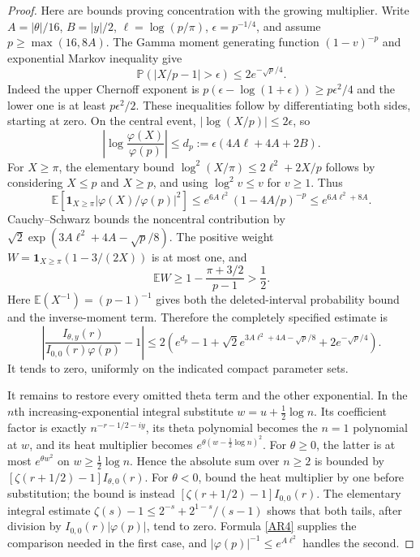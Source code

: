 \documentclass[11pt,a4paper]{article}
\theoremstyle{definition}\newtheorem{definition}[theorem]{Definition}
\begin{document}
\begin{proof}
Here are bounds proving concentration with the growing multiplier. Write
$A=|\theta|/16$, $B=|y|/2$, $\ell=\log(p/\pi)$,
$\epsilon=p^{-1/4}$, and assume $p\ge\max(16,8A)$.
The Gamma moment generating function $(1-v)^{-p}$ and exponential Markov inequality give
\begin{equation}
 \mathbb P(|X/p-1|>\epsilon)\le2e^{-\sqrt p/4}.              \tag{AR3}\label{AR3}
\end{equation}
Indeed the upper Chernoff exponent is $p(\epsilon-\log(1+\epsilon))\ge p\epsilon^2/4$ and the lower one is at least $p\epsilon^2/2$. These inequalities follow by differentiating both sides, starting at zero.
On the central event, $|\log(X/p)|\le2\epsilon$, so
\[
 \left|\log\frac{\varphi(X)}{\varphi(p)}\right|
 \le d_p:=\epsilon(4A\ell+4A+2B).
\]
For $X\ge\pi$, the elementary bound
$\log^2(X/\pi)\le2\ell^2+2X/p$ follows by considering $X\le p$ and $X\ge p$, and using $\log^2 v\le v$ for $v\ge1$. Thus
\[
 \mathbb E\left[\mathbf1_{X\ge\pi}
          |\varphi(X)/\varphi(p)|^2\right]
 \le e^{6A\ell^2}(1-4A/p)^{-p}
 \le e^{6A\ell^2+8A}.
\]
Cauchy--Schwarz bounds the noncentral contribution by
$\sqrt2\exp(3A\ell^2+4A-\sqrt p/8)$. The positive weight
$W=\mathbf1_{X\ge\pi}(1-3/(2X))$ is at most one, and
\[
 \mathbb EW\ge1-\frac{\pi+3/2}{p-1}>\frac12.
\]
Here $\mathbb E(X^{-1})=(p-1)^{-1}$ gives both the deleted-interval probability bound and the inverse-moment term. Therefore the completely specified estimate is
\begin{equation}
 \left|\frac{I_{\theta,y}(r)}{I_{0,0}(r)\varphi(p)}-1\right|
 \le2\left(e^{d_p}-1+
 \sqrt2e^{3A\ell^2+4A-\sqrt p/8}+2e^{-\sqrt p/4}\right).
                                                               \tag{AR4}\label{AR4}
\end{equation}
It tends to zero, uniformly on the indicated compact parameter sets.

It remains to restore every omitted theta term and the other exponential. In the $n$th increasing-exponential integral substitute $w=u+\frac12\log n$. Its coefficient factor is exactly $n^{-r-1/2-iy}$, its theta polynomial becomes the $n=1$ polynomial at $w$, and its heat multiplier becomes $e^{\theta(w-\frac12\log n)^2}$. For $\theta\ge0$, the latter is at most $e^{\theta w^2}$ on $w\ge\frac12\log n$. Hence the absolute sum over $n\ge2$ is bounded by
$[\zeta(r+1/2)-1]I_{\theta,0}(r)$.
For $\theta<0$, bound the heat multiplier by one before substitution; the bound is instead
$[\zeta(r+1/2)-1]I_{0,0}(r)$.
The elementary integral estimate
$\zeta(s)-1\le2^{-s}+2^{1-s}/(s-1)$ shows that both tails, after division by $I_{0,0}(r)|\varphi(p)|$, tend to zero. Formula \eqref{AR4} supplies the comparison needed in the first case, and $|\varphi(p)|^{-1}\le e^{A\ell^2}$ handles the second.


\end{proof}
\end{document}

